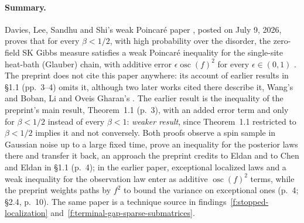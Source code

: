 \documentclass[11pt]{article}
\newcommand{\ploc}[2]{#1}
\newcommand{\sloc}[2]{\cite[#2]{#1}}
\newcommand{\rel}[1]{\textit{#1}}
\newcounter{finding}
\begin{document}
\paragraph{Summary.}
Davies, Lee, Sandhu and Shi's weak Poincar\'e paper
\cite{DaviesEtAl2026-WeakPoincareApproxSL}, posted on July 9, 2026, proves
that for every $\beta<1/2$, with high probability over the disorder, the
zero-field SK Gibbs measure satisfies a weak Poincar\'e inequality for the
single-site heat-bath (Glauber) chain, with additive error
$\epsilon\operatorname{osc}(f)^2$ for every $\epsilon\in(0,1)$
\sloc{DaviesEtAl2026-WeakPoincareApproxSL}{Cor.~1.5, p.~2}. The preprint
does not cite this paper anywhere: its account of earlier results in \ploc{\S1.1 (pp.~3--4)}{introduction.tex:52--87} omits
it, although two later works cited there describe it, Wang's
\sloc{Wang2026-OptimalMixingGlauberSKBetaHalf}{p.~5} and Boban, Li and Oveis
Gharan's \sloc{BobanLiOveisGharan2026-RankOnePerturbedTrickledownSK}{p.~7}.
The earlier result is the inequality of the preprint's main result,
\ploc{Theorem~1.1 (p.~3)}{introduction.tex:33--42}, with an added error term
and only for $\beta<1/2$ instead of every $\beta<1$: \rel{weaker result},
since Theorem~1.1 restricted to $\beta<1/2$ implies it and not conversely.
Both proofs observe a spin sample in Gaussian noise up to a large fixed time,
prove an inequality for the posterior laws there and transfer it back, an
approach the preprint credits to Eldan and to Chen and Eldan in
\ploc{\S1.1 (p.~4)}{introduction.tex:105--110}; in the earlier paper,
exceptional localized laws and a weak inequality for the observation law
enter as additive $\operatorname{osc}(f)^2$ terms, while the preprint
weights paths by $f^2$ to bound the variance on exceptional ones
\ploc{(p.~4; \S2.4, p.~10)}{introduction.tex:111--113;
observation.tex:188--194}. The same paper is a technique source in
findings~\ref{f:stopped-localization}
and~\ref{f:terminal-gap-sparse-submatrices}.
\end{document}
